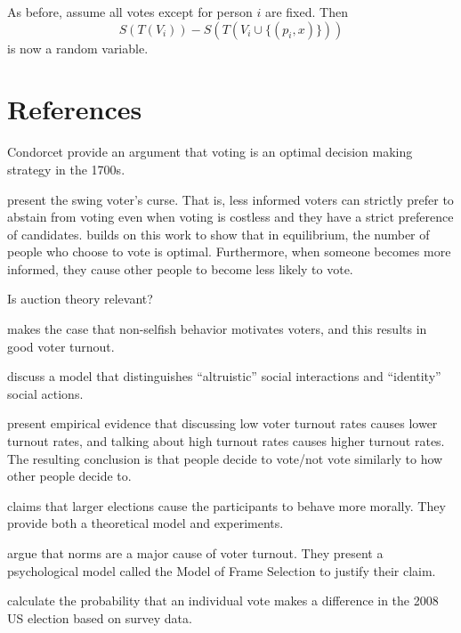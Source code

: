 \documentclass{article}
\DeclareMathOperator*{\argmin}{arg\,min}
\newcommand{\loss}{\ell}
\newcommand{\sloss}{S}
\newcommand{\x}{x}
\newcommand{\xhat}{\hat\x}
\newcommand{\xhato}{\xhat^{\textit{oracle}}}
\newcommand{\V}{V}
\newcommand{\T}{T}
\theoremstyle{definition}
\begin{document}
As before, assume all votes except for person $i$ are fixed.
Then
\begin{equation}
\sloss(\T(\V_i)) - \sloss(\T(\V_i\cup\{(p_i,\x)\}))
\end{equation}
is now a random variable.


\clearpage

\section{References}

Condorcet provide an argument that voting is an optimal decision making strategy in the 1700s.

\cite{feddersen1996swing} present the swing voter's curse.
That is, less informed voters can strictly prefer to abstain from voting even when voting is costless and they have a strict preference of candidates.
\cite{mcmurray2012aggregating} builds on this work to show that in equilibrium, the number of people who choose to vote is optimal.
Furthermore, when someone becomes more informed, they cause other people to become less likely to vote.

Is auction theory relevant?

\cite{edlin2007voting} makes the case that non-selfish behavior motivates voters, and this results in good voter turnout.

\cite{fowler2007beyond} discuss a model that distinguishes ``altruistic'' social interactions and ``identity'' social actions.

\cite{gerber2009descriptive} present empirical evidence that discussing low voter turnout rates causes lower turnout rates, and talking about high turnout rates causes higher turnout rates.
The resulting conclusion is that people decide to vote/not vote similarly to how other people decide to.

\cite{feddersen2009moral} claims that larger elections cause the participants to behave more morally.
They provide both a theoretical model and experiments.

\cite{kroneberg2010norms} argue that norms are a major cause of voter turnout.
They present a psychological model called the Model of Frame Selection to justify their claim.

\cite{gelman2012probability} calculate the probability that an individual vote makes a difference in the 2008 US election based on survey data.


\end{document}
